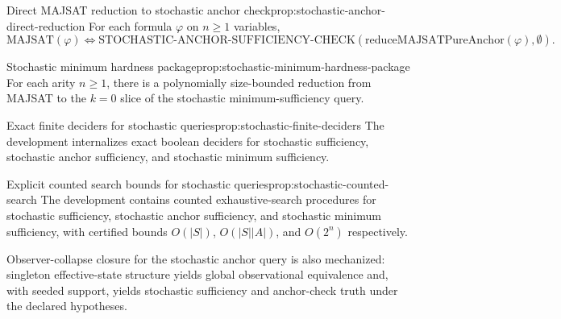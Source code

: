 
\begin{claim}{Direct MAJSAT reduction to stochastic anchor check}{prop:stochastic-anchor-direct-reduction}
For each formula $\varphi$ on $n \ge 1$ variables,
\[
\mathrm{MAJSAT}(\varphi)
\iff
\mathrm{STOCHASTIC\mbox{-}ANCHOR\mbox{-}SUFFICIENCY\mbox{-}CHECK}(\mathrm{reduceMAJSATPureAnchor}(\varphi),\emptyset).
\]
\end{claim}


\begin{claim}{Stochastic minimum hardness package}{prop:stochastic-minimum-hardness-package}
For each arity $n \ge 1$, there is a polynomially size-bounded reduction from
MAJSAT to the $k=0$ slice of the stochastic minimum-sufficiency query.
\end{claim}


\begin{claim}{Exact finite deciders for stochastic queries}{prop:stochastic-finite-deciders}
The development internalizes exact boolean deciders for stochastic sufficiency,
stochastic anchor sufficiency, and stochastic minimum sufficiency.
\end{claim}


\begin{claim}{Explicit counted search bounds for stochastic queries}{prop:stochastic-counted-search}
The development contains counted exhaustive-search procedures for stochastic
sufficiency, stochastic anchor sufficiency, and stochastic minimum sufficiency,
with certified bounds $O(|S|)$, $O(|S||A|)$, and $O(2^n)$ respectively.
\end{claim}


Observer-collapse closure for the stochastic anchor query is also mechanized: singleton effective-state structure yields global observational equivalence and, with seeded support, yields stochastic sufficiency and anchor-check truth under the declared hypotheses.

